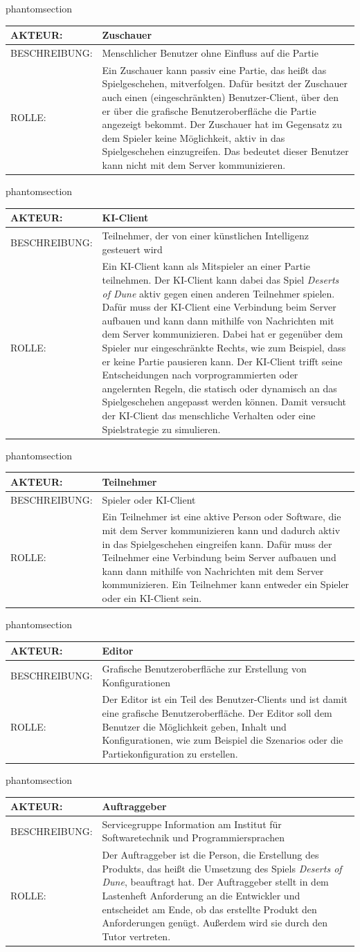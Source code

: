 \documentclass[12pt]{article}
\makeatletter
\newcommand{\labeltext}[2]{%
  \@bsphack
  \csname phantomsection\endcsname %
  \def\@currentlabel{#1}{\label{#2}}%
  \@esphack
}
\newcommand{\akteur}[4]{
\labeltext{#2}{#1}
\begin{tabularx}{16cm}{|l|X|}
\hline 
AKTEUR: & #2 \\
\hline
BESCHREIBUNG: & #3 \\
\hline
ROLLE: & #4 \\ 
\hline
\end{tabularx}
}
\makeatother
\begin{document}
\akteur{A-Zuschauer}{Zuschauer}{Menschlicher Benutzer ohne Einfluss auf die Partie}{Ein Zuschauer kann passiv eine Partie, das heißt das Spielgeschehen, mitverfolgen. Dafür besitzt der Zuschauer auch einen (eingeschränkten) Benutzer-Client, über den er über die grafische Benutzeroberfläche die Partie angezeigt bekommt. Der Zuschauer hat im Gegensatz zu dem Spieler keine Möglichkeit, aktiv in das Spielgeschehen einzugreifen. Das bedeutet dieser Benutzer kann nicht mit dem Server kommunizieren.}

\akteur{A-KI-Client}{KI-Client}{Teilnehmer, der von einer künstlichen Intelligenz gesteuert wird}{Ein KI-Client kann als Mitspieler an einer Partie teilnehmen. Der KI-Client kann dabei das Spiel \textit{Deserts of Dune} aktiv gegen einen anderen Teilnehmer spielen. Dafür muss der KI-Client eine Verbindung beim Server aufbauen und kann dann mithilfe von Nachrichten mit dem Server kommunizieren. Dabei hat er gegenüber dem Spieler nur eingeschränkte Rechts, wie zum Beispiel, dass er keine Partie pausieren kann. Der KI-Client trifft seine Entscheidungen nach vorprogrammierten oder angelernten Regeln, die statisch oder dynamisch an das Spielgeschehen angepasst werden können. Damit versucht der KI-Client das menschliche Verhalten oder eine Spielstrategie zu simulieren.}

\akteur{A-Teilnehmer}{Teilnehmer}{Spieler oder KI-Client}{Ein Teilnehmer ist eine aktive Person oder Software, die mit dem Server kommunizieren kann und dadurch aktiv in das Spielgeschehen eingreifen kann. Dafür muss der Teilnehmer eine Verbindung beim Server aufbauen und kann dann mithilfe von Nachrichten mit dem Server kommunizieren. Ein Teilnehmer kann entweder ein Spieler oder ein KI-Client sein.}

\akteur{A-Editor}{Editor}{Grafische Benutzeroberfläche zur Erstellung von Konfigurationen}{Der Editor ist ein Teil des Benutzer-Clients und ist damit eine grafische Benutzeroberfläche. Der Editor soll dem Benutzer die Möglichkeit geben, Inhalt und Konfigurationen, wie zum Beispiel die Szenarios oder die Partiekonfiguration zu erstellen.}

\akteur{A-Auftraggeber}{Auftraggeber}{Servicegruppe Information am Institut für Softwaretechnik und Programmiersprachen}{Der Auftraggeber ist die Person, die Erstellung des Produkts, das heißt die Umsetzung des Spiels \textit{Deserts of Dune}, beauftragt hat. Der Auftraggeber stellt in dem Lastenheft Anforderung an die Entwickler und entscheidet am Ende, ob das erstellte Produkt den Anforderungen genügt. Außerdem wird sie durch den Tutor vertreten.}
\end{document}
